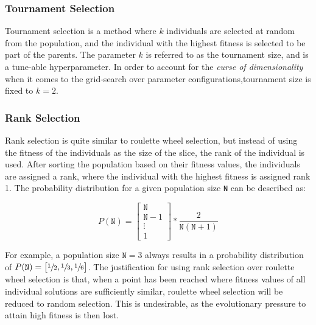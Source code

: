 \documentclass{article}
\begin{document}
\subsubsection*{Tournament Selection}
\label{subsubsec:ga_sel_ts}
\vspace{-0.2cm}
Tournament selection \cite{tournament} is a method where $k$ individuals are selected at random from the population, and the individual with the highest fitness is selected to be part of the parents.
The parameter $k$ is referred to as the tournament size, and is a tune-able hyperparameter.
In order to account for the \textit{curse of dimensionality} when it comes to the grid-search over parameter configurations,tournament size is fixed to $k=2$.

\subsubsection*{Rank Selection}
\label{subsubsec:ga_sel_rs}
\vspace{-0.2cm}
Rank selection \cite{rank} is quite similar to roulette wheel selection, but instead of using the fitness of the individuals as the size of the slice, the rank of the individual is used.
After sorting the population based on their fitness values, the individuals are assigned a rank, where the individual with the highest fitness is assigned rank 1.
The probability distribution for a given population size \texttt{N} can be described as:

$$ P(\texttt{N}) = \begin{bmatrix} \texttt{N} \\ \texttt{N}-1 \\ \vdots \\ 1 \end{bmatrix} * \frac{2}{\texttt{N}(\texttt{N}+1)}$$

For example, a population size $\texttt{N}=3$ always results in a probability distribution of
$P(\texttt{N}) = \begin{bmatrix} \sfrac{1}{2}, \sfrac{1}{3}, \sfrac{1}{6} \end{bmatrix}$.
The justification for using rank selection over roulette wheel selection is that, when a point has been reached where fitness values of all individual solutions are sufficiently similar, roulette wheel selection will be reduced to random selection.
This is undesirable, as the evolutionary pressure to attain high fitness is then lost.
\end{document}

